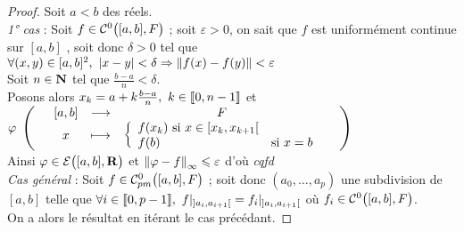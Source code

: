 
    \begin{proof}
    Soit $a<b$ des réels. \\ \emph{1° cas} : Soit $f\in{\mathcal{C}}^0\big([a,b],F\big)$ ; soit $\varepsilon>0$, on sait que $f$ est uniformément 
    continue sur $[a,b]$ %
    , soit donc $\delta>0$ tel que $\forall (x,y)\in[a,b]^2 ,~\left\vert x-y \right\vert<\delta \Rightarrow 
    \left\Vert f(x)-f(y) \right\Vert<\varepsilon$ \\ Soit $n\in{\mathbf{N}}$ tel que $\frac{b-a}{n}<\delta$. \\ Posons alors $x_k=a+k\frac{b-a}{n} , ~k\in{\llbracket 0,n-1 \rrbracket}$ et 
    $\varphi ~\appli{[a,b]}{x}{F}{\left\{ \begin{array}{ll} f(x_k)$ si $x\in[x_k,x_{k+1}[ \\ f(b) &$si $x=b \end{array}\right.}$ \\
    Ainsi $\varphi\in{\mathcal{E}\big([a,b],{\mathbf{R}}\big)}$ et $\left\Vert \varphi - f \right\Vert_{\infty} \leqslant \varepsilon$ d'où \emph{cqfd} \vspace*{0.2cm} \\ 
    \emph{Cas général} : Soit $f\in{\mathcal{C}_{pm}^0}\big([a,b],F\big)$ ; soit donc $(a_0,\dots ,a_p)$ une subdivision de $[a,b]$ telle que $\forall 
    i\in{\llbracket 0,p-1 \rrbracket} , ~ f|_{]a_i,a_{i+1}[} = f_i|_{]a_i,a_{i+1}[}$ où $f_i\in{\mathcal{C}}^0\big([a,b],F\big)$. \\
    On a alors le résultat en itérant le cas précédant.
    \end{proof} \medskip

    \hfill {} \hfill ${}$
    \vspace*{0.5cm} \\
    
    \fin